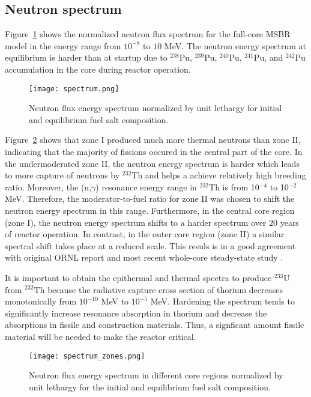 \subsection{Neutron spectrum}
Figure~\ref{fig:spectrum} shows the normalized neutron flux spectrum for the full-core \gls{MSBR} model in the energy range from $10^{-8}$ to $10$ MeV. The neutron energy spectrum at equilibrium is harder than at startup due to $^{238}$Pu, $^{239}$Pu, $^{240}$Pu, $^{241}$Pu, and $^{242}$Pu accumulation in the core during reactor operation. 
\begin{figure}[t!] %
  \centering
  \texttt{[image: spectrum.png]} 
  \caption{Neutron flux energy spectrum normalized by unit lethargy for initial and equilibrium fuel salt composition.}
  \label{fig:spectrum}
\end{figure}

Figure~\ref{fig:spectrum_zones} shows that zone I produced much more thermal neutrons than zone II, indicating that the majority of fissions occured in the central part of the core. In the undermoderated zone II, the neutron energy spectrum is harder which leads to more capture of neutrons by $^{232}$Th and helps a achieve relatively high breeding ratio. Moreover, the (n,$\gamma$) resonance energy range in $^{232}$Th is from 10$^{-4}$ to 10$^{-2}$ MeV. Therefore, the moderator-to-fuel ratio for zone II was chosen to shift the neutron energy spectrum in this range. Furthermore, in the central core region (zone I), the neutron energy spectrum shifts to a harder spectrum over 20 years of reactor operation. In contrast, in the outer core region (zone II) a similar spectral shift takes place at a reduced scale. This resuls is in a good agreement with original ORNL report \cite{robertson_conceptual_1971} and most recent whole-core steady-state study \cite{park_whole_2015}.

It is important to obtain the epithermal and thermal spectra to produce $^{233}$U from $^{232}$Th because the radiative capture cross section of thorium decreases monotonically from $10^{-10}$ MeV to $10^{-5}$ MeV. Hardening the spectrum tends to significantly increase resonance absorption in thorium and decrease the absorptions in fissile and construction materials. Thus, a signficant amount fissile material will be needed to make the reactor critical. 

\begin{figure}[htp!] %
  \centering
  \texttt{[image: spectrum\_zones.png]} 
  \caption{Neutron flux energy spectrum in different core regions normalized by unit lethargy for the initial and equilibrium fuel salt composition.}
  \label{fig:spectrum_zones}
\end{figure}

